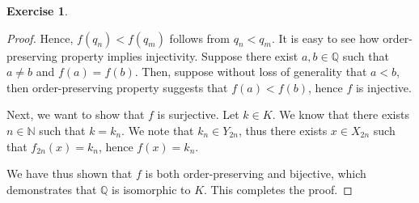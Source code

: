 \documentclass[11pt]{article}
\newcommand{\bbN}{\mathbb{N}}
\newcommand{\bbQ}{\mathbb{Q}}
\theoremstyle{definition}
\newtheorem{exercise}[theorem]{Exercise}
\numberwithin{equation}{subsection}
\begin{document}
\begin{exercise}
\begin{proof}
Hence, $f(q_n)<f(q_m)$ follows from $q_n<q_m$. It is easy to see how order-preserving property implies injectivity. Suppose there exist $a,b \in \bbQ$ such that $a \neq b$ and $f(a)=f(b)$. Then, suppose without loss of generality that $a<b$, then order-preserving property suggests that $f(a)<f(b)$, hence $f$ is injective.

Next, we want to show that $f$ is surjective. Let $k \in K$. We know that there exists $n \in \bbN$ such that $k = k_n$. We note that $k_n \in Y_{2n}$, thus there exists $x \in X_{2n}$ such that $f_{2n}(x) = k_n$, hence $f(x)=k_n$.

We have thus shown that $f$ is both order-preserving and bijective, which demonstrates that $\bbQ$ is isomorphic to $K$. This completes the proof.

\renewcommand\qedsymbol{QED}
\end{proof}

\end{exercise}
\end{document}
